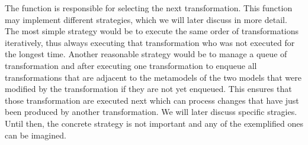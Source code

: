 The  function is responsible for selecting the next transformation.
This function may implement different strategies, which we will later discuss in more detail.
The most simple strategy would be to execute the same order of transformations iteratively, thus always executing that transformation who was not executed for the longest time.
Another reasonable strategy would be to manage a queue of transformation and after executing one transformation to enqueue all transformations that are adjacent to the metamodels of the two models that were modified by the transformation if they are not yet enqueued.
This ensures that those transformation are executed next which can process changes that have just been produced by another transformation.
We will later discuss specific stragies.
Until then, the concrete strategy is not important and any of the exemplified ones can be imagined.



